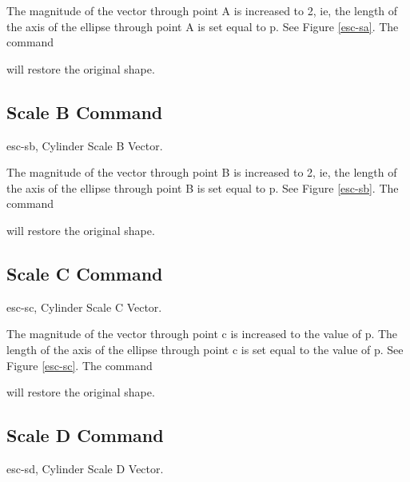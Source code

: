 The magnitude of the vector through point A is increased to 2, ie,
the length of the axis of the ellipse through point A is set equal to p.
See Figure \ref{esc-sa}.  The command


will restore the original shape.

\subsection{Scale B Command}
\mfig esc-sb, Cylinder Scale B Vector.


The magnitude of the vector through point B is increased to 2, ie,
the length of the axis of the ellipse through point B is set equal to p.
See Figure \ref{esc-sb}.  The command


will restore the original shape.

\subsection{Scale C Command}
\mfig esc-sc, Cylinder Scale C Vector.


The magnitude of the vector through point c is increased to the value of
p.  The length of the axis of the ellipse through point c is set equal to the
value of p.  See Figure \ref{esc-sc}.  The command


will restore the original shape.

\subsection{Scale D Command}
\mfig esc-sd, Cylinder Scale D Vector.



